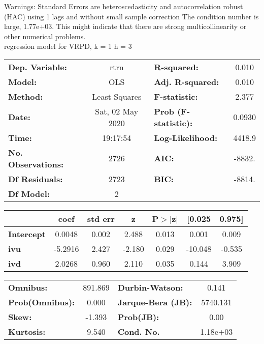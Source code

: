 Warnings: \newline
 [1] Standard Errors are heteroscedasticity and autocorrelation robust (HAC) using 1 lags and without small sample correction \newline
 [2] The condition number is large, 1.77e+03. This might indicate that there are \newline
 strong multicollinearity or other numerical problems.\\ 

regression model for VRPD, k = 1 h = 3\begin{center}
\begin{tabular}{lclc}
\toprule
\textbf{Dep. Variable:}    &       rtrn       & \textbf{  R-squared:         } &     0.010   \\
\textbf{Model:}            &       OLS        & \textbf{  Adj. R-squared:    } &     0.010   \\
\textbf{Method:}           &  Least Squares   & \textbf{  F-statistic:       } &     2.377   \\
\textbf{Date:}             & Sat, 02 May 2020 & \textbf{  Prob (F-statistic):} &   0.0930    \\
\textbf{Time:}             &     19:17:54     & \textbf{  Log-Likelihood:    } &    4418.9   \\
\textbf{No. Observations:} &        2726      & \textbf{  AIC:               } &    -8832.   \\
\textbf{Df Residuals:}     &        2723      & \textbf{  BIC:               } &    -8814.   \\
\textbf{Df Model:}         &           2      & \textbf{                     } &             \\
\bottomrule
\end{tabular}
\begin{tabular}{lcccccc}
                   & \textbf{coef} & \textbf{std err} & \textbf{z} & \textbf{P$> |$z$|$} & \textbf{[0.025} & \textbf{0.975]}  \\
\midrule
\textbf{Intercept} &       0.0048  &        0.002     &     2.488  &         0.013        &        0.001    &        0.009     \\
\textbf{ivu}       &      -5.2916  &        2.427     &    -2.180  &         0.029        &      -10.048    &       -0.535     \\
\textbf{ivd}       &       2.0268  &        0.960     &     2.110  &         0.035        &        0.144    &        3.909     \\
\bottomrule
\end{tabular}
\begin{tabular}{lclc}
\textbf{Omnibus:}       & 891.869 & \textbf{  Durbin-Watson:     } &    0.141  \\
\textbf{Prob(Omnibus):} &   0.000 & \textbf{  Jarque-Bera (JB):  } & 5740.131  \\
\textbf{Skew:}          &  -1.393 & \textbf{  Prob(JB):          } &     0.00  \\
\textbf{Kurtosis:}      &   9.540 & \textbf{  Cond. No.          } & 1.18e+03  \\
\bottomrule
\end{tabular}
\end{center}


